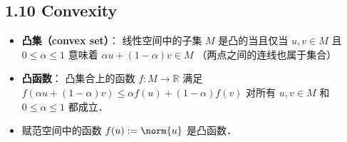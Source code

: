 \subsection{1.10 Convexity}
\begin{itemize}
\item \textbf{凸集（convex set）}： 线性空间中的子集 $M$ 是凸的当且仅当 $u, v\in M$ 且 $0\le\alpha\le1$ 意味着 $\alpha u+(1-\alpha)v\in M$ （两点之间的连线也属于集合）

\item \textbf{凸函数}： 凸集合上的函数 $f:M\to\mathbb R$ 满足 $f(\alpha u + (1-\alpha)v) \le \alpha f(u)+(1-\alpha)f(v)$ 对所有 $u, v\in M$ 和 $0\le\alpha\le1$ 都成立．

\item 赋范空间中的函数 $f(u) := \norm{u}$ 是凸函数．
\end{itemize}


